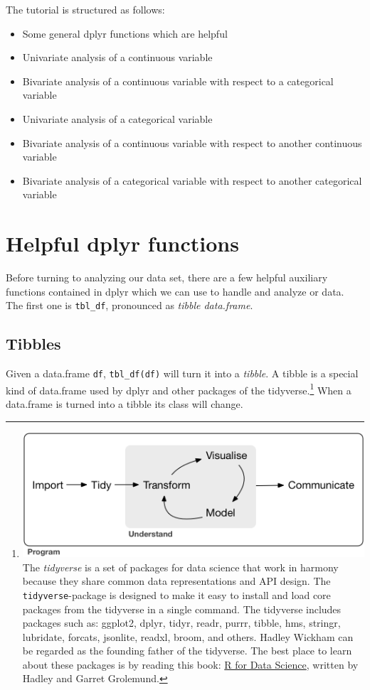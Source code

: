 \documentclass[]{tufte-book}
\providecommand{\tightlist}{%
  \setlength{\itemsep}{0pt}\setlength{\parskip}{0pt}}
\begin{document}
The tutorial is structured as follows:

\begin{itemize}
\tightlist
\item
  Some general dplyr functions which are helpful
\item
  Univariate analysis of a continuous variable
\item
  Bivariate analysis of a continuous variable with respect to a categorical variable
\item
  Univariate analysis of a categorical variable
\item
  Bivariate analysis of a continuous variable with respect to another continuous variable
\item
  Bivariate analysis of a categorical variable with respect to another categorical variable
\end{itemize}

\hypertarget{helpful-dplyr-functions}{%
\section{Helpful dplyr functions}\label{helpful-dplyr-functions}}

Before turning to analyzing our data set, there are a few helpful auxiliary functions contained in dplyr which we can use to handle and analyze or data. The first one is \texttt{tbl\_df}, pronounced as \emph{tibble data.frame}.

\hypertarget{tibbles}{%
\subsection{Tibbles}\label{tibbles}}

Given a data.frame \texttt{df}, \texttt{tbl\_df(df)} will turn it into a \emph{tibble}. A tibble is a special kind of data.frame used by dplyr and other packages of the tidyverse.\footnote{\includegraphics{images/tidyverse.png} The \emph{tidyverse} is a set of packages for data science that work in harmony because they share common data representations and API design. The \texttt{tidyverse}-package is designed to make it easy to install and load core packages from the tidyverse in a single command. The tidyverse includes packages such as: ggplot2, dplyr, tidyr, readr, purrr, tibble, hms, stringr, lubridate, forcats, jsonlite, readxl, broom, and others. Hadley Wickham can be regarded as the founding father of the tidyverse. The best place to learn about these packages is by reading this book: \href{http://r4ds.had.co.nz/}{R for Data Science}, written by Hadley and Garret Grolemund.} When a data.frame is turned into a tibble its class will change.
\end{document}

